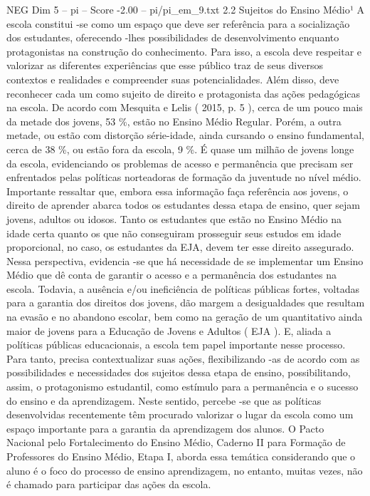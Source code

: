 \begin{textsample}{NEG Dim 5 – pi – Score -2.00 – pi/pi\_em\_9.txt}  \label{ex:f5_neg_052}
2.2 Sujeitos do Ensino Médio¹ A escola constitui -se como um espaço que deve ser referência para a socialização dos estudantes, oferecendo -lhes possibilidades de desenvolvimento enquanto protagonistas na construção do conhecimento.
Para isso, a escola deve respeitar e valorizar as diferentes experiências que esse público traz de seus diversos contextos e realidades e compreender suas potencialidades.
Além disso, deve reconhecer cada um como sujeito de direito e protagonista das ações pedagógicas na escola.
De acordo com Mesquita e Lelis ( 2015, p. 5 ), cerca de um pouco mais da metade dos jovens, 53 \%, estão no Ensino Médio Regular.
Porém, a outra metade, ou estão com distorção série-idade, ainda cursando o ensino fundamental, cerca de 38 \%, ou estão fora da escola, 9 \%.
É quase um milhão de jovens longe da escola, evidenciando os problemas de acesso e permanência que precisam ser enfrentados pelas políticas norteadoras de formação da juventude no nível médio.
Importante ressaltar que, embora essa informação faça referência aos jovens, o direito de aprender abarca todos os estudantes dessa etapa de ensino, quer sejam jovens, adultos ou idosos.
Tanto os estudantes que estão no Ensino Médio na idade certa quanto os que não conseguiram prosseguir seus estudos em idade proporcional, no caso, os estudantes da EJA, devem ter esse direito assegurado.
Nessa perspectiva, evidencia -se que há necessidade de se implementar um Ensino Médio que dê conta de garantir o acesso e a permanência dos estudantes na escola.
Todavia, a ausência e/ou ineficiência de políticas públicas fortes, voltadas para a garantia dos direitos dos jovens, dão margem a desigualdades que resultam na evasão e no abandono escolar, bem como na geração de um quantitativo ainda maior de jovens para a Educação de Jovens e Adultos ( EJA ).
E, aliada a políticas públicas educacionais, a escola tem papel importante nesse processo.
Para tanto, precisa contextualizar suas ações, flexibilizando -as de acordo com as possibilidades e necessidades dos sujeitos dessa etapa de ensino, possibilitando, assim, o protagonismo estudantil, como estímulo para a permanência e o sucesso do ensino e da aprendizagem.
Neste sentido, percebe -se que as políticas desenvolvidas recentemente têm procurado valorizar o lugar da escola como um espaço importante para a garantia da aprendizagem dos alunos.
O Pacto Nacional pelo Fortalecimento do Ensino Médio, Caderno II para Formação de Professores do Ensino Médio, Etapa I, aborda essa temática considerando que o aluno é o foco do processo de ensino aprendizagem, no entanto, muitas vezes, não é chamado para participar das ações da escola.

\end{textsample}

